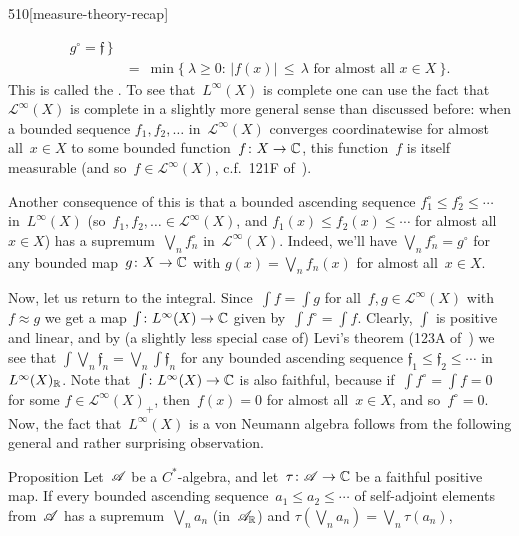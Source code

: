\begin{parsec}{510}[measure-theory-recap]
\begin{point}{50}
\begin{alignat*}{3}
g^\circ = \mathfrak{f}\,\} \\
&=\ \min\{\ \lambda\geq 0\colon\,
		\left|f(x)\right|\,\leq\,\lambda
	\text{ for almost all~$x\in X$}\ \}.
\end{alignat*}
This is called the .%
To see that~$L^\infty(X)$ is complete
one can use the fact that~$\mathcal{L}^\infty(X)$
is complete in a slightly more general sense than discussed before:
when a bounded sequence $f_1,f_2,\dotsc$
in~$\mathcal{L}^\infty(X)$
converges coordinatewise for almost all~$x\in X$
to some bounded function~$f\colon X\to\mathbb{C}$,
this function~$f$ is itself measurable (and so~$f\in\mathcal{L}^\infty(X)$,
c.f.~121F of~\cite{fremlin}).

Another consequence of this
is that a bounded ascending sequence
$f_1^\circ \leq f_2^\circ \leq \dotsb$
in~$L^\infty(X)$
(so~$f_1,f_2,\dotsc\in\mathcal{L}^\infty(X)$,
and $f_1(x)\leq f_2(x)\leq\dotsb$ for almost all~$x\in X$)
has a supremum~$\bigvee_n f_n^\circ$ in~$\mathcal{L}^\infty(X)$.
Indeed, we'll have
$\bigvee_n f_n^\circ = g^\circ$
for any bounded map~$g\colon X\to\mathbb{C}$
with $g(x)=\bigvee_n f_n(x)$
for almost all~$x\in X$.
\end{point}%
\begin{point}{60}%
Now, let us return to the integral.
Since~$\int f = \int g$
for all~$f,g\in \mathcal{L}^\infty(X)$
with $f\approx g$
we get a map
$\int \colon L^\infty(X)\to \mathbb{C}$
given
by~$\int  f^\circ = \int f$.
Clearly, $\int$ is positive and linear,
and by (a slightly less special case
of) Levi's theorem (123A of~\cite{fremlin})
we see that $\int \bigvee_n \mathfrak{f}_n
= \bigvee_n \int \mathfrak{f}_n$
for any bounded ascending sequence
$\mathfrak{f}_1\leq \mathfrak{f}_2\leq\dotsb$
in~$L^\infty(X)_{\mathbb{R}}$.
Note that~$\int\colon L^\infty(X)\to\mathbb{C}$
is also faithful,
because if~$\int f^\circ=\int f = 0$
for some $f\in \mathcal{L}^\infty(X)_+$,
then~$f(x)=0$ for almost all~$x\in X$,
and so~$f^\circ=0$.
Now,
the fact that~$L^\infty(X)$
is a von Neumann algebra follows from
the following general and rather surprising observation.
\end{point}
\begin{point}{70}{Proposition}%
Let~$\mathscr{A}$ be a $C^*$-algebra,
and let~$\tau\colon \mathscr{A}\to\mathbb{C}$
be a faithful positive map.
If every bounded ascending sequence~$a_1\leq a_2\leq \dotsb$
of self-adjoint elements from~$\mathscr{A}$ has a supremum~$\bigvee_n a_n$
(in~$\mathscr{A}_{\mathbb{R}}$)
and
$\tau(\bigvee_n a_n)=\bigvee_n \tau (a_n)$,

\end{point}
\end{parsec}
